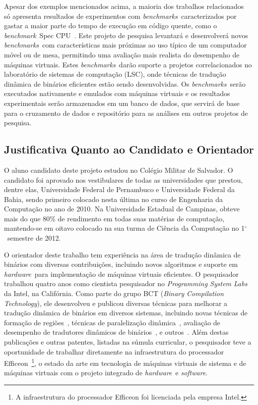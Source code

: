 \documentclass[a4paper,12pt]{article}
\def\degr{${}^\circ$}
\newcommand{\software}{\emph{software}}
\newcommand{\hardware}{\emph{hardware}}
\newcommand{\benchmark}{\emph{benchmark}}
\newcommand{\benchmarks}{\emph{benchmarks}}
\begin{document}
Apesar dos exemplos mencionados acima, a maioria dos trabalhos
relacionados~\cite{Hen00, pin} só apresenta resultados de experimentos com
\benchmarks\ caracterizados por gastar a maior parte do tempo de execução em
código quente, como o \benchmark\ Spec CPU~\cite{Hen00}. Este projeto de
pesquisa levantará e desenvolverá novos \benchmarks\ com características mais
próximas ao uso típico de um computador móvel ou de mesa, permitindo uma
avaliação mais realista do desempenho de máquinas virtuais. Estes
\benchmarks\ darão suporte a projetos correlacionados no laboratório de sistemas
de computação (LSC), onde técnicas de tradução dinâmica de binários eficientes
estão sendo desenvolvidas. Os \benchmarks\ serão executados nativamente e
emulados com máquinas virtuais e os resultados experimentais serão armazenados
em um banco de dados, que servirá de base para o cruzamento de dados e
repositório para as análises em outros projetos de pesquisa.


\subsection{Justificativa Quanto ao Candidato e Orientador}
\label{subsec:just}

O aluno candidato deste projeto estudou no Colégio Militar de Salvador. O
candidato foi aprovado nos vestibulares de todas as universidades que prestou,
dentre elas, Universidade Federal de Pernambuco e Universidade Federal da Bahia,
sendo primeiro colocado nesta última no curso de Engenharia da Computação no ano
de 2010. Na Universidade Estadual de Campinas, obteve mais do que 80\% de
rendimento em todas suas matérias de computação, mantendo-se em oitavo colocado
na sua turma de Ciência da Computação no 1\degr\ semestre de 2012. %

O orientador deste trabalho tem experiência na área de tradução dinâmica de
binários com diversas contribuições, incluindo novos algoritmos e suporte em
\hardware\ para implementação de máquinas virtuais eficientes. O pesquisador
trabalhou quatro anos como cientista pesquisador no \emph{Programming System
  Labs} da Intel, na Califórnia. Como parte do grupo BCT (\emph{Binary
  Compilation Technology}), ele desenvolveu e publicou diversas técnicas para
melhorar a tradução dinâmica de binários em diversos sistemas, incluindo novas
técnicas de formação de regiões~\cite{BWBW11,PGW+08,BWW+10}, técnicas de
paralelização dinâmica~\cite{WWB+09}, avaliação de desempenho de tradutores
dinâmicos de binários~\cite{BW08, BW09}, e outros~\cite{WHBW11, BWWA05, BWWA06,
  PABW10}. Além destas publicações e outras patentes, listadas na súmula
curricular, o pesquisador teve a oportunidade de trabalhar diretamente na
infraestrutura do processador Efficeon~\cite{Kre03}\footnote{A infraestrutura do
  processador Efficeon foi licenciada pela empresa Intel.}, o estado da arte em
tecnologia de máquinas virtuais de sistema e de máquinas virtuais com o projeto
integrado de \hardware\ e \software.
\end{document}
